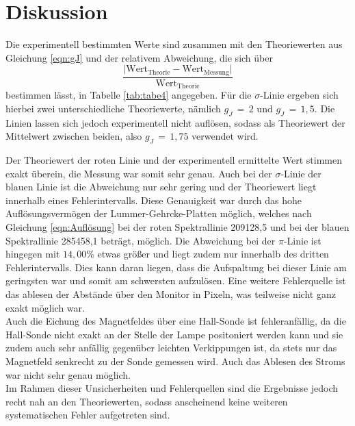 \section{Diskussion}
\label{sec:Diskussion}
Die experimentell bestimmten Werte sind zusammen mit den Theoriewerten aus
Gleichung \ref{eqn:gJ} und der relativem Abweichung,
die sich über
\begin{equation}
  \frac{\lvert \text{Wert}_{\text{Theorie}}-\text{Wert}_{\text{Messung}}\rvert}{\text{Wert}_{\text{Theorie}}}
  \label{eqn:abw}
\end{equation}
bestimmen lässt, in Tabelle \ref{tab:tabe4} angegeben. Für die $\sigma$-Linie ergeben sich hierbei
zwei unterschiedliche Theoriewerte, nämlich $g_J\,=\, 2$ und $g_J\,=\, 1,5$. Die Linien lassen sich jedoch experimentell nicht
auflösen, sodass als Theoriewert der Mittelwert zwischen beiden, also $g_J\,=\, 1,75 $ verwendet wird.

Der Theoriewert der roten Linie und der experimentell ermittelte Wert stimmen exakt überein, die Messung war somit
sehr genau. Auch bei der $\sigma$-Linie der blauen Linie ist die Abweichung nur sehr gering und der Theoriewert
liegt innerhalb eines Fehlerintervalls. Diese Genauigkeit war durch das hohe Auflösungsvermögen der Lummer-Gehrcke-Platten
möglich, welches nach Gleichung \ref{eqn:Auflösung} bei der roten Spektrallinie 209128,5 und bei der blauen
Spektrallinie 285458,1 beträgt, möglich.
Die Abweichung bei der $\pi$-Linie ist hingegen mit $14,00\%$ etwas größer und liegt zudem nur innerhalb des
dritten Fehlerintervalls. Dies kann daran liegen, dass die Aufspaltung bei dieser Linie am geringsten war und
somit am schwersten aufzulösen. Eine weitere Fehlerquelle ist das ablesen der Abstände über den Monitor in
Pixeln, was teilweise nicht ganz exakt möglich war. \\
Auch die Eichung des Magnetfeldes über eine Hall-Sonde ist fehleranfällig, da die Hall-Sonde nicht exakt an
der Stelle der Lampe positoniert werden kann und sie zudem auch sehr anfällig gegenüber leichten Verkippungen ist, da
stets nur das Magnetfeld senkrecht zu der Sonde gemessen wird.
Auch das Ablesen des Stroms war nicht sehr genau möglich. \\
Im Rahmen dieser Unsicherheiten und Fehlerquellen sind die Ergebnisse jedoch recht nah an den Theoriewerten, sodass
anscheinend keine weiteren systematischen Fehler aufgetreten sind.

